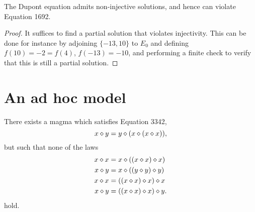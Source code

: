 \begin{corollary}\label{non-inject} The Dupont equation admits non-injective solutions, and hence can violate Equation 1692.
\end{corollary}

\begin{proof} It suffices to find a partial solution that violates injectivity.  This can be done for instance by adjoining $\{-13, 10\}$ to $E_0$ and defining $f(10)=-2 = f(4)$, $f(-13)=-10$, and performing a finite check to verify that this is still a partial solution.
\end{proof}

\section{An ad hoc model}\label{adhoc-model}

\begin{theorem}  There exists a magma which satisfies Equation 3342,
$$ x \diamond y = y \diamond (x \diamond (x \diamond x)),$$
but such that none of the laws
\begin{align*}
  x \diamond x &= x \diamond ((x \diamond x) \diamond x) \\
  x \diamond y &= x \diamond ((y \diamond y) \diamond y) \\
  x \diamond x &= ((x \diamond x) \diamond x) \diamond x \\
  x \diamond y &= ((x \diamond x) \diamond x) \diamond y.
\end{align*}
hold.
\end{theorem}

